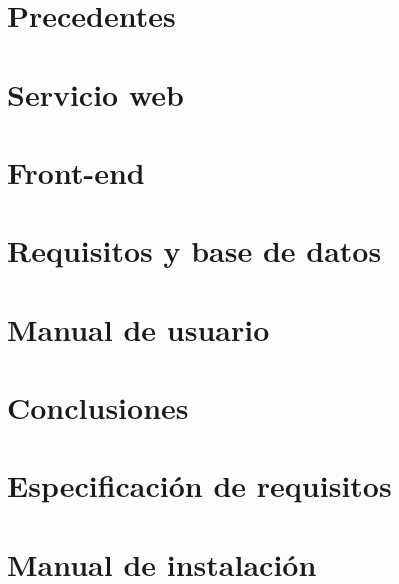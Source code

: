 \documentclass[11pt,a4paper]{article}
\begin{document}
\newpage
\section{Precedentes}


\newpage
\section{Servicio web\label{sec:s_web}}


\newpage
\section{Front-end\label{sec:front}}


\newpage
\section{Requisitos y base de datos\label{sec:req}}



\newpage
\section{Manual de usuario\label{sec:manual}}


\newpage
\section{Conclusiones\label{sec:conc}}

\newpage
{\small


}


\newpage
\appendix

\section{Especificación de requisitos\label{app:req}}


\newpage
\section{Manual de instalación\label{app:manual}}


\appendix


%
\end{document}
